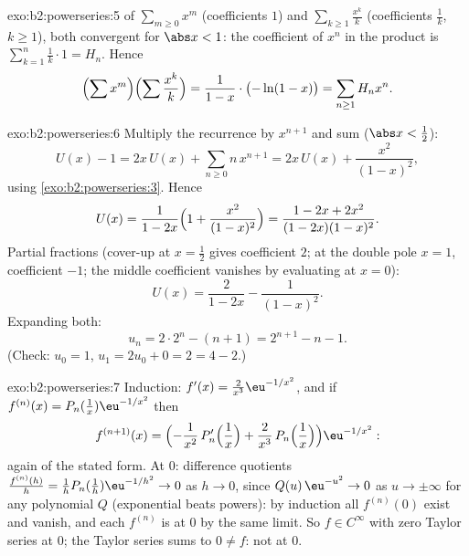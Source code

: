 \begin{solution}{exo:b2:powerseries:5}
 of $\sum_{m \geq 0} x^m$ (coefficients $1$) and
$\sum_{k\geq1} \frac{x^k}{k}$ (coefficients $\frac1k$, $k \geq
1$), both  convergent for $\abs x < 1$: the coefficient
of $x^n$ in the product is $\sum_{k=1}^{n} \frac1k \cdot 1 = H_n$.
Hence
\[
\Bigl(\sum x^m\Bigr)\Bigl(\sum \frac{x^k}{k}\Bigr)
= \frac{1}{1-x}\cdot\bigl(-\ln(1-x)\bigr)
= \sum_{n\geq1} H_n x^n .
\]
\end{solution}

\begin{solution}{exo:b2:powerseries:6}
Multiply the recurrence by $x^{n+1}$ and sum ($\abs x <
\frac12$):
\[
U(x) - 1 = 2x\,U(x) + \sum_{n\geq0} n\,x^{n+1}
= 2x\,U(x) + \frac{x^2}{(1-x)^2} ,
\]
using \cref{exo:b2:powerseries:3}. Hence
\[
U(x) = \frac{1}{1 - 2x}\Bigl(1 + \frac{x^2}{(1-x)^2}\Bigr)
= \frac{1 - 2x + 2x^2}{(1-2x)(1-x)^2} .
\]
Partial fractions (cover-up at $x = \frac12$ gives coefficient $2$;
at the double pole $x = 1$, coefficient $-1$; the middle
coefficient vanishes by evaluating at $x = 0$):
\[
U(x) = \frac{2}{1-2x} - \frac{1}{(1 - x)^2} .
\]
Expanding both:
\[
u_n = 2\cdot 2^n - (n + 1) = 2^{n+1} - n - 1 .
\]
(Check: $u_0 = 1$, $u_1 = 2u_0 + 0 = 2 = 4 - 2$.)
\end{solution}

\begin{solution}{exo:b2:powerseries:7}
Induction: $f'(x) = \frac{2}{x^3}\eu^{-1/x^2}$, and if $f^{(n)}(x)
= P_n(\tfrac1x)\eu^{-1/x^2}$ then
\[
f^{(n+1)}(x) =
\Bigl(-\frac{1}{x^2}\,P_n'\Bigl(\frac1x\Bigr) +
\frac{2}{x^3}\,P_n\Bigl(\frac1x\Bigr)\Bigr)\eu^{-1/x^2} :
\]
again of the stated form. At $0$: difference quotients $\frac{f^{(n)}(h)}{h} =
\frac1h P_n(\frac1h)\eu^{-1/h^2} \to 0$ as $h \to 0$, since
$Q(u)\,\eu^{-u^2} \to 0$ as $u \to \pm\infty$ for any polynomial
$Q$ (exponential beats powers): by induction all $f^{(n)}(0)$ exist
and vanish, and each $f^{(n)}$ is  at $0$ by the same
limit. So $f \in C^\infty$ with zero Taylor series at $0$; the
Taylor series sums to $0 \neq f$: not  at $0$.
\end{solution}

